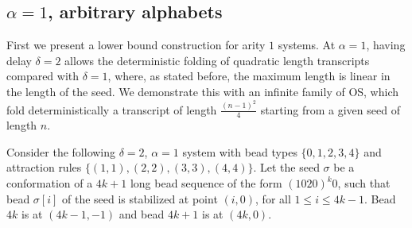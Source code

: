 

\subsection{$\alpha = 1$, arbitrary alphabets}
First we present a lower bound construction for arity $1$ systems. At $\alpha=1$, having delay $\delta=2$ allows the deterministic folding of quadratic length transcripts compared with $\delta=1$, where, as stated before, the maximum length is linear in the length of the seed. We demonstrate this with an infinite family of OS, which fold deterministically a transcript of length $\frac{(n-1)^2}{4}$ starting from a given seed of length $n$.

Consider the following $\delta=2$, $\alpha=1$ system with bead types $\{0,1,2,3,4\}$ and attraction rules $\{(1,1),(2,2), (3,3),(4,4)\}$. Let the seed $\sigma$ be a conformation of a $4k+1$ long bead sequence of the form $(1020)^k0$, such that bead $\sigma[i]$ of the seed is stabilized at point $(i,0)$, for all $1\leq i\leq 4k-1$. Bead $4k$ is at $(4k-1,-1)$ and bead $4k+1$ is at $(4k,0)$.
\vspace{0.1cm}

